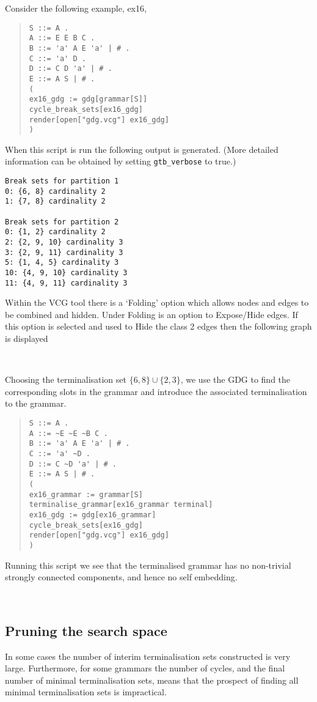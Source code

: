 Consider the following example, ex16,
\begin{quote}
\begin{verbatim}
S ::= A .
A ::= E E B C .
B ::= 'a' A E 'a' | # .
C ::= 'a' D .
D ::= C D 'a' | # .
E ::= A S | # .
(
ex16_gdg := gdg[grammar[S]]
cycle_break_sets[ex16_gdg]
render[open["gdg.vcg"] ex16_gdg]
)
\end{verbatim}
\end{quote}
When this script is run the following output is generated.
(More detailed information can be obtained by setting
\verb+gtb_verbose+ to true.)
{\small
\begin{verbatim}
Break sets for partition 1
0: {6, 8} cardinality 2
1: {7, 8} cardinality 2

Break sets for partition 2
0: {1, 2} cardinality 2
2: {2, 9, 10} cardinality 3
3: {2, 9, 11} cardinality 3
5: {1, 4, 5} cardinality 3
10: {4, 9, 10} cardinality 3
11: {4, 9, 11} cardinality 3
\end{verbatim}
}

Within the VCG tool there is a `Folding' option which allows nodes and
edges to be combined and hidden. Under Folding is an
option to Expose/Hide edges. If this option is selected and used to
Hide the class 2 edges then the following graph is displayed
\begin{center}
\\[2mm]
\end{center}

Choosing the terminalisation set 
$\{6,8\}\cup\{2,3\}$, we use the GDG to find the corresponding slots
in the grammar and introduce the associated terminalisation to the grammar.
\begin{quote}
\begin{verbatim}
S ::= A .
A ::= ~E ~E ~B C .
B ::= 'a' A E 'a' | # .
C ::= 'a' ~D .
D ::= C ~D 'a' | # .
E ::= A S | # .
(
ex16_grammar := grammar[S] 
terminalise_grammar[ex16_grammar terminal]
ex16_gdg := gdg[ex16_grammar]
cycle_break_sets[ex16_gdg]
render[open["gdg.vcg"] ex16_gdg]
)
\end{verbatim}
\end{quote}

Running this script we see that the terminalised grammar has no
non-trivial strongly connected components, and hence no self embedding.
\begin{center}
\\[2mm]
\end{center}


\subsection{Pruning the search space}
In some cases the number of interim terminalisation sets
constructed is very large.
Furthermore, for some grammars the number of cycles, and the final number of
minimal terminalisation sets, means that the prospect of finding all
minimal terminalisation sets is impractical.

